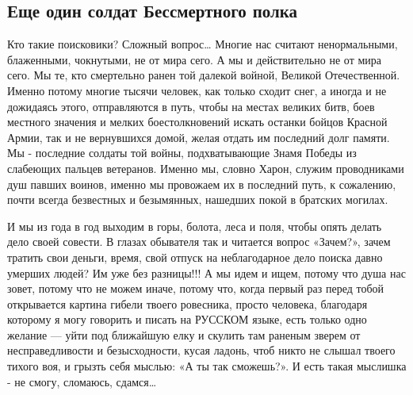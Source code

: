  
 
 

\subsection{Еще один солдат Бессмертного полка}
\label{sec:29_10_2020.fb.fraulein_marta.1.soldat_polk}


Кто такие поисковики? Сложный вопрос… Многие нас считают ненормальными,
блаженными, чокнутыми, не от мира сего. А мы и действительно не от мира сего.
Мы те, кто смертельно ранен той далекой войной, Великой Отечественной. Именно
потому многие тысячи человек, как только сходит снег, а иногда и не дожидаясь
этого, отправляются в путь, чтобы на местах великих битв, боев местного
значения и мелких боестолкновений искать останки бойцов Красной Армии, так и не
вернувшихся домой, желая отдать им последний долг памяти. Мы - последние
солдаты той войны, подхватывающие Знамя Победы из слабеющих пальцев ветеранов.
Именно мы, словно Харон, служим проводниками душ павших воинов, именно мы
провожаем их в последний путь, к сожалению, почти всегда безвестных и
безымянных, нашедших покой в братских могилах.

И мы из года в год выходим в горы, болота, леса и поля, чтобы опять делать дело
своей совести. В глазах обывателя так и читается вопрос «Зачем?», зачем тратить
свои деньги, время, свой отпуск на неблагодарное дело поиска давно умерших
людей? Им уже без разницы!!! А мы идем и ищем, потому что душа нас зовет,
потому что не можем иначе, потому что, когда первый раз перед тобой открывается
картина гибели твоего ровесника, просто человека, благодаря которому я могу
говорить и писать на РУССКОМ языке, есть только одно желание --- уйти под
ближайшую елку и скулить там раненым зверем от несправедливости и
безысходности, кусая ладонь, чтоб никто не слышал твоего тихого воя, и грызть
себя мыслью: «А ты так сможешь?». И есть такая мыслишка - не смогу, сломаюсь,
сдамся…

